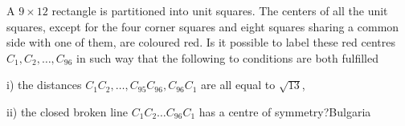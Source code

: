 A  $ 9 \times 12$ rectangle is partitioned into unit squares. The centers of all the unit squares, except for the four corner squares and eight squares sharing a common side with one of them, are coloured red. Is it possible to label these red centres $ C_1,C_2,\ldots ,C_{96}$ in such way that the following to conditions are both fulfilled

i) the distances $C_1C_2,\ldots ,C_{95}C_{96}, C_{96}C_{1}$ are all equal to $ \sqrt {13}$, 

ii) the closed broken line $ C_1C_2\ldots C_{96}C_1$ has a centre of symmetry?Bulgaria